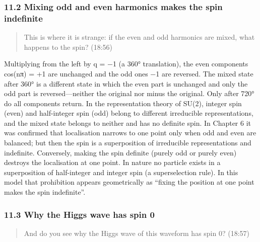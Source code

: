\documentclass[
  a4paper,
]{article}
\begin{document}
\subsubsection{11.2 Mixing odd and even harmonics makes the spin
indefinite}\label{mixing-odd-and-even-harmonics-makes-the-spin-indefinite}

\begin{quote}
This is where it is strange: if the even and odd harmonics are mixed,
what happens to the spin? (18:56)
\end{quote}

Multiplying from the left by q = −1 (a 360° translation), the even
components cos(nπ) = +1 are unchanged and the odd ones −1 are reversed.
The mixed state after 360° is a different state in which the even part
is unchanged and only the odd part is reversed---neither the original
nor minus the original. Only after 720° do all components return. In the
representation theory of SU(2), integer spin (even) and half-integer
spin (odd) belong to different irreducible representations, and the
mixed state belongs to neither and has no definite spin. In Chapter 6 it
was confirmed that localisation narrows to one point only when odd and
even are balanced; but then the spin is a superposition of irreducible
representations and indefinite. Conversely, making the spin definite
(purely odd or purely even) destroys the localisation at one point. In
nature no particle exists in a superposition of half-integer and integer
spin (a superselection rule). In this model that prohibition appears
geometrically as ``fixing the position at one point makes the spin
indefinite''.

\subsubsection{11.3 Why the Higgs wave has spin
0}\label{why-the-higgs-wave-has-spin-0}

\begin{quote}
And do you see why the Higgs wave of this waveform has spin 0? (18:57)
\end{quote}
\end{document}
